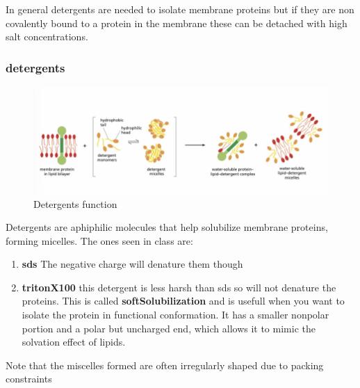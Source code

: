 \documentclass[../main.tex]{subfiles}
\begin{document}
In general detergents are needed to isolate membrane proteins but if they are non covalently bound to a protein in the membrane these can be detached with high salt concentrations.

\subsubsection{detergents}

\begin{figure}[H]
    \centering
    \includegraphics[width=\linewidth]{detergents.png}
    \caption{Detergents function}
    \label{fig:enter-label}
\end{figure}
Detergents are aphiphilic molecules that help solubilize membrane proteins, forming micelles. The ones seen in class are:
\begin{enumerate}
    \item \textbf{\gls{sds}} The negative charge will denature them though
    \item \textbf{\gls{tritonX100}} this detergent is less harsh than sds so will not denature the proteins. This is called \textbf{\gls{softSolubilization}} and is usefull when you want to isolate the protein in functional conformation. It has a smaller nonpolar portion and a polar but uncharged end, which allows it to mimic the solvation effect of lipids. 
\end{enumerate}
\begin{remark}
Note that the miscelles formed are often irregularly shaped due to packing constraints
\end{remark}
\end{document}
